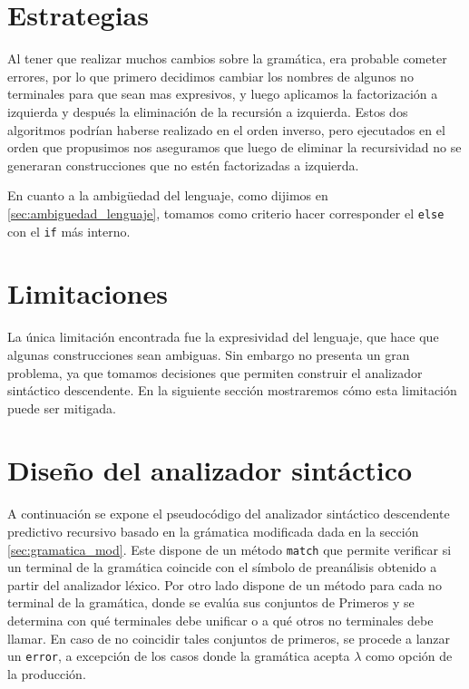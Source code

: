\section{Estrategias}
Al tener que realizar muchos cambios sobre la gramática, era probable cometer errores, por lo que primero decidimos cambiar los nombres de algunos no terminales para que sean mas expresivos, y luego aplicamos la factorización a izquierda y después la eliminación de la recursión a izquierda. Estos dos algoritmos podrían haberse realizado en el orden inverso, pero ejecutados en el orden que propusimos nos aseguramos que luego de eliminar la recursividad no se generaran construcciones que no estén factorizadas a izquierda. 

En cuanto a la ambigüedad del lenguaje, como dijimos en \ref{sec:ambiguedad_lenguaje}, tomamos como criterio hacer corresponder el \texttt{else} con el \texttt{if} más interno. 

\section{Limitaciones}
La única limitación encontrada fue la expresividad del lenguaje, que hace que algunas construcciones sean ambiguas. Sin embargo no presenta un gran problema, ya que tomamos decisiones que permiten construir el analizador sintáctico descendente. En la siguiente sección mostraremos cómo esta limitación puede ser mitigada.

\section{Diseño del analizador sintáctico}
\label{sec:diseno_sintactico}
A continuación se expone el pseudocódigo del analizador sintáctico descendente predictivo recursivo basado en la grámatica modificada dada en la sección \ref{sec:gramatica_mod}. Este dispone de un método \texttt{match} que permite verificar si un terminal de la gramática coincide con el símbolo de preanálisis obtenido a partir del analizador léxico. Por otro lado dispone de un método para cada no terminal de la gramática, donde se evalúa sus conjuntos de Primeros y se determina con qué terminales debe unificar o a qué otros no terminales debe llamar. En caso de no coincidir tales conjuntos de primeros, se procede a lanzar un \texttt{error}, a excepción de los casos donde la gramática acepta $\lambda$ como opción de la producción.

